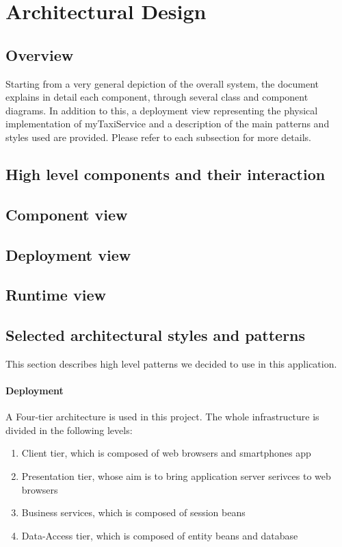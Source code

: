 \pagebreak
\section{Architectural Design}
 
\subsection{Overview}
Starting from a very general depiction of the overall system, the document explains in detail each component, through several class and component diagrams. In addition to this, a deployment view representing the physical implementation of myTaxiService and a description of the main patterns and styles used are provided. Please refer to each subsection for more details.
\subsection{High level components and their interaction}
\subsection{Component view}
\subsection{Deployment view}
\subsection{Runtime view}
\subsection{Selected architectural styles and patterns}

This section describes high level patterns we decided to use in this application.

\paragraph{Deployment} A Four-tier architecture is used in this project.
The whole infrastructure is divided in the following levels:
\begin{enumerate}
\item{Client tier, which is composed of web browsers and smartphones app}
\item{Presentation tier, whose aim is to bring application server serivces to web browsers}
\item{Business services, which is composed of session beans }
\item{Data-Access tier, which is composed of entity beans and database}
\end{enumerate}

